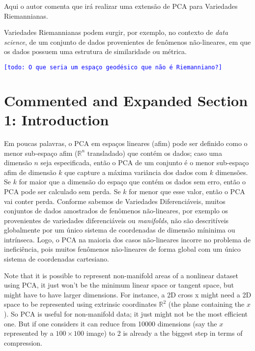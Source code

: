 \documentclass[a4paper,titlepage]{article}
\newcommand{\indraftnote}[1]{\textcolor{blue}{\texttt{\footnotesize [#1]}}}
\newcommand{\todo}[1]{\indraftnote{todo: #1}} %
\begin{document}
Aqui o autor comenta que irá realizar uma extensão de PCA para Variedades
Riemannianas.

Variedades Riemannianas podem surgir, por exemplo, no contexto de \emph{data science}, de um conjunto de dados
provenientes de fenômenos não-lineares, em que os dados possuem uma estrutura de
similaridade ou métrica.

\todo{O que seria um espaço geodésico que não é Riemanniano?}

{
\vspace{1em}
\vspace{1em}
}

\section{Commented and Expanded Section 1: Introduction}

{
\vspace{1em}
\vspace{1em}
}

Em poucas palavras, o PCA em espaços lineares (afim) pode ser definido
como o menor sub-espaço afim ($\mathbb R^n$ transladado) que contém os dados;
caso uma dimensão $n$ seja especificada, então o PCA de um conjunto é 
o menor sub-espaço afim de dimensão $k$ que capture a máxima variância dos dados
com $k$ dimensões. Se $k$ for maior que a dimensão do espaço que contém os dados
sem erro, então o PCA pode ser calculado sem perda. Se $k$ for menor que esse
valor, então o PCA vai conter perda. Conforme sabemos de Variedades
Diferenciáveis, muitos conjuntos de dados amostrados de fenômenos não-lineares,
por exemplo os provenientes de variedades diferenciáveis ou \emph{manifolds},
não são descritíveis globalmente por um único sistema de coordenadas de dimensão
míninima ou intrínseca. Logo, o PCA na maioria dos casos não-lineares incorre no
problema de ineficiência, pois muitos fenômenos não-lineares de forma global
com um único sistema de coordenadas cartesiano.

Note that it is possible to represent non-manifold areas of a nonlinear dataset
using PCA, it just won't be the minimum linear space or tangent space, but might
have to have larger dimensions. For instance, a 2D cross x might need a 2D space
to be represented using extrinsic coordinates $\mathbb R^2$ (the plane
containing the $x$). So PCA is useful for non-manifold data; it just might not
be the most efficient one. But if one considers it can reduce from 10000
dimensions (say the $x$ represented by a $100\times100$ image) to 2 is already a
the biggest step in terms of compression.
\end{document}
